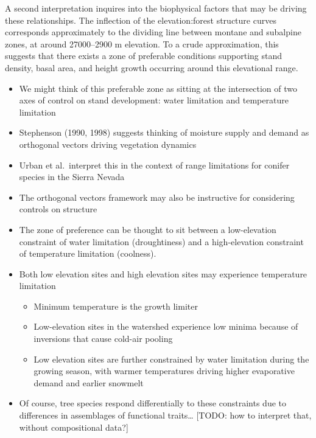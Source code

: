 \documentclass[
  12pt,
]{article}
\providecommand{\tightlist}{%
  \setlength{\itemsep}{0pt}\setlength{\parskip}{0pt}}
\begin{document}
A second interpretation inquires into the biophysical factors that may
be driving these relationships. The inflection of the elevation:forest
structure curves corresponds approximately to the dividing line between
montane and subalpine zones, at around 27000--2900 m elevation. To a
crude approximation, this suggests that there exists a zone of
preferable conditions supporting stand density, basal area, and height
growth occurring around this elevational range.

\begin{itemize}
\tightlist
\item
  We might think of this preferable zone as sitting at the intersection
  of two axes of control on stand development: water limitation and
  temperature limitation
\item
  Stephenson (1990, 1998) suggests thinking of moisture supply and
  demand as orthogonal vectors driving vegetation dynamics
\item
  Urban et al.~interpret this in the context of range limitations for
  conifer species in the Sierra Nevada
\item
  The orthogonal vectors framework may also be instructive for
  considering controls on structure
\item
  The zone of preference can be thought to sit between a low-elevation
  constraint of water limitation (droughtiness) and a high-elevation
  constraint of temperature limitation (coolness).
\item
  Both low elevation sites and high elevation sites may experience
  temperature limitation

  \begin{itemize}
  \tightlist
  \item
    Minimum temperature is the growth limiter
  \item
    Low-elevation sites in the watershed experience low minima because
    of inversions that cause cold-air pooling
  \item
    Low elevation sites are further constrained by water limitation
    during the growing season, with warmer temperatures driving higher
    evaporative demand and earlier snowmelt
  \end{itemize}
\item
  Of course, tree species respond differentially to these constraints
  due to differences in assemblages of functional traits\ldots{}
  {[}TODO: how to interpret that, without compositional data?{]}
\end{itemize}
\end{document}
